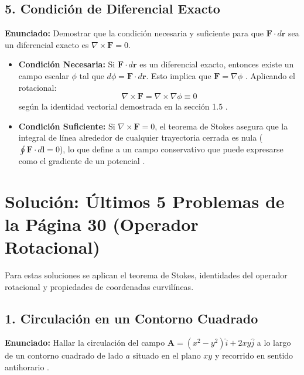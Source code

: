\documentclass[a4paper]{article}
\begin{document}
\subsection*{5. Condición de Diferencial Exacto}
\textbf{Enunciado:} Demostrar que la condición necesaria y suficiente para que $\mathbf{F} \cdot d\mathbf{r}$ sea un diferencial exacto es $\nabla \times \mathbf{F} = 0$.

\begin{itemize}
    \item \textbf{Condición Necesaria:} Si $\mathbf{F} \cdot d\mathbf{r}$ es un diferencial exacto, entonces existe un campo escalar $\phi$ tal que $d\phi = \mathbf{F} \cdot d\mathbf{r}$. Esto implica que $\mathbf{F} = \nabla \phi$ \cite{79, 118}. Aplicando el rotacional:
    \begin{equation}
        \nabla \times \mathbf{F} = \nabla \times \nabla \phi \equiv 0
    \end{equation}
    según la identidad vectorial demostrada en la sección 1.5 \cite{106, 109}.
    \item \textbf{Condición Suficiente:} Si $\nabla \times \mathbf{F} = 0$, el teorema de Stokes \cite{97} asegura que la integral de línea alrededor de cualquier trayectoria cerrada es nula ($\oint \mathbf{F} \cdot d\mathbf{l} = 0$), lo que define a un campo conservativo que puede expresarse como el gradiente de un potencial \cite{106, 120}.
\end{itemize}


\section*{Solución: Últimos 5 Problemas de la Página 30 (Operador Rotacional)}

Para estas soluciones se aplican el teorema de Stokes, identidades del operador rotacional y propiedades de coordenadas curvilíneas.

\subsection*{1. Circulación en un Contorno Cuadrado}
\textbf{Enunciado:} Hallar la circulación del campo $\mathbf{A} = (x^2 - y^2)\hat{i} + 2xy\hat{j}$ a lo largo de un contorno cuadrado de lado $a$ situado en el plano $xy$ y recorrido en sentido antihorario \cite{99}.
\end{document}
